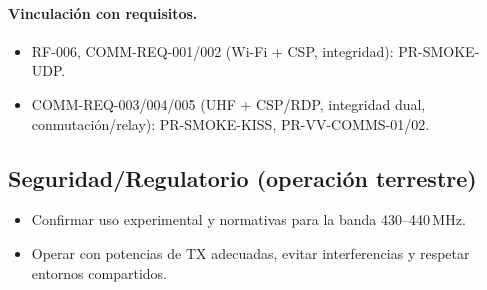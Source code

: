 \paragraph{Vinculación con requisitos.}
\begin{itemize}
  \item RF-006, COMM-REQ-001/002 (Wi-Fi + CSP, integridad): PR-SMOKE-UDP.
  \item COMM-REQ-003/004/005 (UHF + CSP/RDP, integridad dual, conmutación/relay): PR-SMOKE-KISS, PR-VV-COMMS-01/02.
\end{itemize}

\subsection*{Seguridad/Regulatorio (operación terrestre)}
\begin{itemize}
  \item Confirmar uso experimental y normativas para la banda 430–440\,MHz.
  \item Operar con potencias de TX adecuadas, evitar interferencias y respetar entornos compartidos.
\end{itemize}
